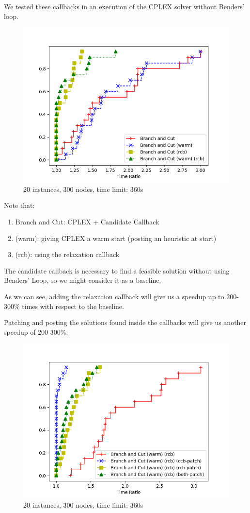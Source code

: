 We tested these callbacks in an execution of the CPLEX solver without Benders' loop.

\FloatBarrier
\begin{figure}[h]
    \centering
    \includegraphics*[width=.6\textwidth]{../plots/perfprof_bnc_times.png}
    \caption*{20 instances, 300 nodes, time limit: 360s}
\end{figure}
\FloatBarrier

Note that:
\begin{enumerate}
    \item[] Branch and Cut: CPLEX + Candidate Callback
    \item[] (warm): giving CPLEX a warm start (posting an heuristic at start)
    \item[] (rcb): using the relaxation callback
\end{enumerate}

The candidate callback is necessary to find a feasible solution without using Benders' Loop, so we might consider it as a baseline.

As we can see, adding the relaxation callback will give us a speedup up to 200-300\% times with respect to the baseline.

Patching and posting the solutions found inside the callbacks will give us another speedup of 200-300\%:

\FloatBarrier
\begin{figure}[h]
    \centering
    \includegraphics*[width=.6\textwidth]{../plots/perfprof_bnc_patch_times.png}
    \caption*{20 instances, 300 nodes, time limit: 360s}
\end{figure}
\FloatBarrier

